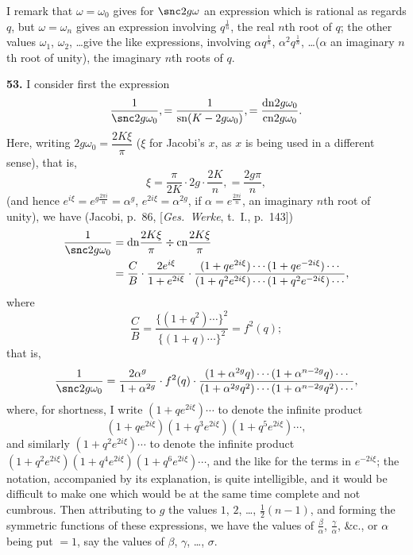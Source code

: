 \documentclass[11pt,a4paper]{book}
\providecommand{\sn}{\mathrm{sn}}
\providecommand{\cn}{\mathrm{cn}}
\providecommand{\dn}{\mathrm{dn}}
\begin{document}
I remark that $\omega = \omega_0$ gives for $\snc 2g\omega$ an expression which is rational as regards $q$, but $\omega = \omega_n$ gives an expression involving $q^{\frac{1}{n}}$, the real $n$th root of $q$; the other values $\omega_1$, $\omega_2$, \ldots give the like expressions, involving $\alpha q^{\frac{1}{n}}$, $\alpha^2 q^{\frac{1}{n}}$, \ldots ($\alpha$ an imaginary $n$th root of unity), the imaginary $n$th roots of $q$.

\textbf{53.} I consider first the expression
\[
\frac{1}{\snc 2g\omega_0}, = \frac{1}{\sn(K - 2g\omega_0)}, = \frac{\dn 2g\omega_0}{\cn 2g\omega_0}.
\]
Here, writing $2g\omega_0 = \dfrac{2K\xi}{\pi}$ ($\xi$ for Jacobi's $x$, as $x$ is being used in a different sense), that is,
\[
\xi = \frac{\pi}{2K} \cdot 2g \cdot \frac{2K}{n}, = \frac{2g\pi}{n},
\]
(and hence $e^{i\xi} = e^{g\frac{2\pi i}{n}} = \alpha^g$, $e^{2i\xi} = \alpha^{2g}$, if $\alpha = e^{\frac{2\pi i}{n}}$, an imaginary $n$th root of unity), we have (Jacobi, p.~86, [\textit{Ges.~Werke}, t.~I., p.~143])
\begin{align*}
\frac{1}{\snc 2g\omega_0}
&= \dn \frac{2K\xi}{\pi} \div \cn \frac{2K\xi}{\pi} \\
&= \frac{C}{B} \cdot \frac{2e^{i\xi}}{1 + e^{2i\xi}} \cdot
\frac{(1 + qe^{2i\xi}) \cdots (1 + qe^{-2i\xi}) \cdots}
{(1 + q^2 e^{2i\xi}) \cdots (1 + q^2 e^{-2i\xi}) \cdots},
\end{align*}
where
\[
\frac{C}{B} = \frac{\{(1 + q^2) \cdots\}^2}{\{(1 + q) \cdots\}^2} = f^2(q);
\]
that is,
\[
\frac{1}{\snc 2g\omega_0}
= \frac{2\alpha^g}{1 + \alpha^{2g}} \cdot f^2(q) \cdot
\frac{(1 + \alpha^{2g}q) \cdots (1 + \alpha^{n-2g}q) \cdots}
{(1 + \alpha^{2g}q^2) \cdots (1 + \alpha^{n-2g}q^2) \cdots},
\]
where, for shortness, I write $(1 + qe^{2i\xi}) \cdots$ to denote the infinite product
\[
(1 + qe^{2i\xi})(1 + q^3 e^{2i\xi})(1 + q^5 e^{2i\xi}) \cdots,
\]
and similarly $(1 + q^2 e^{2i\xi}) \cdots$ to denote the infinite product $(1 + q^2 e^{2i\xi})(1 + q^4 e^{2i\xi})(1 + q^6 e^{2i\xi}) \cdots$, and the like for the terms in $e^{-2i\xi}$; the notation, accompanied by its explanation, is quite intelligible, and it would be difficult to make one which would be at the same time complete and not cumbrous. Then attributing to $g$ the values $1$, $2$, \ldots, $\frac{1}{2}(n-1)$, and forming the symmetric functions of these expressions, we have the values of $\frac{\beta}{\alpha}$, $\frac{\gamma}{\alpha}$, \&c., or $\alpha$ being put $= 1$, say the values of $\beta$, $\gamma$, \ldots, $\sigma$.
\end{document}
